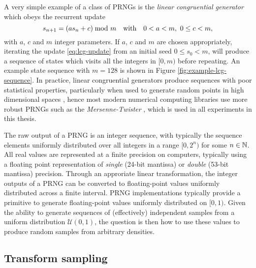 A very simple example of a class of \acp{PRNG} is the \emph{linear congruential generator} \citep{lehmer1951mathematical} which obeys the recurrent update
\begin{equation}\label{eq:lcg-update}
  s_{n+1} = (a s_n + c) \kern-4pt\mod m
  \quad \textrm{with} \quad
   0 < a < m,~ 0 \leq c < m,
\end{equation}
with $a$, $c$ and $m$ integer parameters. If $a$, $c$ and $m$ are chosen appropriately, iterating the update \eqref{eq:lcg-update} from an initial seed $0 \leq s_0 < m$, will produce a sequence of states which visits all the integers in $[0, m)$ before repeating. An example state sequence with $m=128$ is shown in Figure \ref{fig:example-lcg-sequence}. In practice, linear congruential generators produce sequences with poor statistical properties, particularly when used to generate random points in high dimensional spaces \citep{marsaglia1968random}, hence most modern numerical computing libraries use more robust \acp{PRNG} such as the \emph{Mersenne-Twister} \citep{matsumoto1998mersenne}, which is used in all experiments in this thesis.

The raw output of a \ac{PRNG} is an integer sequence, with typically the sequence elements uniformly distributed over all integers in a range $[0, 2^n)$ for some $n \in \mathbb{N}$. All real values are represented at a finite precision on computers, typically using a floating point representation \citep{ieee2008standard} of \emph{single} (24-bit mantissa) or \emph{double} (53-bit mantissa) precision. Through an approriate linear transformation, the integer outputs of a \ac{PRNG} can be converted to floating-point values uniformly distributed across a finite interval. \ac{PRNG} implementations typically provide a primitive to generate floating-point values uniformly distributed on $[0, 1)$. Given the ability to generate sequences of (effectively) independent samples from a uniform distribution $\mathcal{U}(0,1)$, the question is then how to use these values to produce random samples from arbitrary densities. %

\subsection{Transform sampling}

